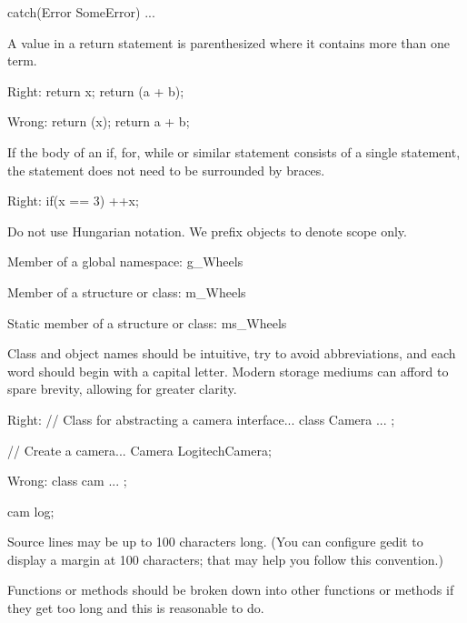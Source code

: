 catch(Error SomeError)
{
    ...
}
\stopCodeExample

\item
A value in a return statement is parenthesized where it contains more than one term.

Right:
\startCodeExample
return x;
return (a + b);
\stopCodeExample

Wrong:
\startCodeExample
return (x);
return a + b;
\stopCodeExample

\item
If the body of an if, for, while or similar statement consists of a single statement, the statement does not need to be surrounded by braces.


Right:
\startCodeExample
if(x == 3)
  ++x;
\stopCodeExample

\stopitemize



\startitemize[4]
\item
Do not use Hungarian notation. We prefix objects to denote scope only.


Member of a global namespace:
\startCodeExample
g_Wheels
\stopCodeExample

Member of a structure or class:
\startCodeExample
m_Wheels
\stopCodeExample

Static member of a structure or class:
\startCodeExample
ms_Wheels
\stopCodeExample

\item
Class and object names should be intuitive, try to avoid abbreviations, and each word should begin with a capital letter. Modern storage mediums can afford to spare brevity, allowing for greater clarity.


Right:
\startCodeExample
// Class for abstracting a camera interface...
class Camera
{
    ...
};

// Create a camera...
Camera LogitechCamera;
\stopCodeExample

Wrong:
\startCodeExample
class cam
{
    ...
};

cam log;
\stopCodeExample

\stopitemize


\startitemize[4]
\item
Source lines may be up to 100 characters long. (You can configure gedit to display a margin at 100 characters; that may help you follow this convention.)

\item
Functions or methods should be broken down into other functions or methods if they get too long and this is reasonable to do.

